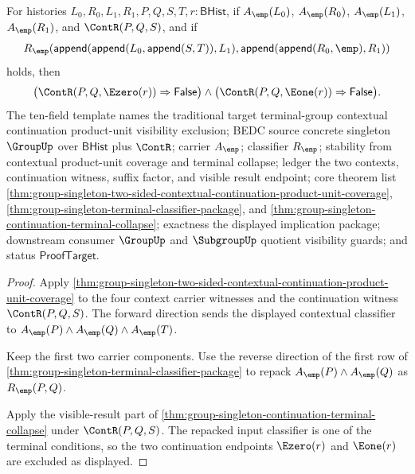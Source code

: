 \begin{theorem}
\label{thm:group-singleton-two-sided-contextual-continuation-product-unit-visible-exclusion}
For histories $L_0,R_0,L_1,R_1,P,Q,S,T,r:\mathsf{BHist}$, if
$A_{\emp}(L_0)$, $A_{\emp}(R_0)$, $A_{\emp}(L_1)$, $A_{\emp}(R_1)$, and
$\ContR(P,Q,S)$, and if
$$
R_{\emp}(\mathsf{append}(\mathsf{append}(L_0,\mathsf{append}(S,T)),L_1),
\mathsf{append}(\mathsf{append}(R_0,\emp),R_1))
$$
holds, then
$$
\bigl(\ContR(P,Q,\Ezero(r))\Rightarrow\mathsf{False}\bigr)\land
\bigl(\ContR(P,Q,\Eone(r))\Rightarrow\mathsf{False}\bigr).
$$
The ten-field template names the traditional target terminal-group contextual
continuation product-unit visibility exclusion; BEDC source concrete singleton
$\GroupUp$ over $\mathsf{BHist}$ plus $\ContR$; carrier $A_{\emp}$; classifier
$R_{\emp}$; stability from contextual product-unit coverage and terminal
collapse; ledger the two contexts, continuation witness, suffix factor, and
visible result endpoint; core theorem list
\autoref{thm:group-singleton-two-sided-contextual-continuation-product-unit-coverage},
\autoref{thm:group-singleton-terminal-classifier-package}, and
\autoref{thm:group-singleton-continuation-terminal-collapse}; exactness the
displayed implication package; downstream consumer $\GroupUp$ and
$\SubgroupUp$ quotient visibility guards; and status $\mathsf{ProofTarget}$.
\end{theorem}
\begin{proof}
Apply
\autoref{thm:group-singleton-two-sided-contextual-continuation-product-unit-coverage}
to the four context carrier witnesses and the continuation witness
$\ContR(P,Q,S)$. The forward direction sends the displayed contextual classifier
to $A_{\emp}(P)\land A_{\emp}(Q)\land A_{\emp}(T)$.

Keep the first two carrier components. Use the reverse direction of the first
row of \autoref{thm:group-singleton-terminal-classifier-package} to repack
$A_{\emp}(P)\land A_{\emp}(Q)$ as $R_{\emp}(P,Q)$.

Apply the visible-result part of
\autoref{thm:group-singleton-continuation-terminal-collapse} under
$\ContR(P,Q,S)$. The repacked input classifier is one of the terminal
conditions, so the two continuation endpoints $\Ezero(r)$ and $\Eone(r)$ are
excluded as displayed.
\end{proof}
